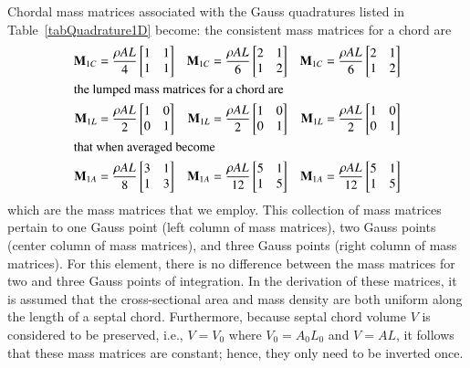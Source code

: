 Chordal mass matrices associated with the Gauss quadratures listed in Table~\ref{tabQuadrature1D} become: the consistent mass matrices for a chord are
\begin{subequations}
	\label{massMatrices1D}
	\begin{align}
	\mathbf{M}_{1C} & = \frac{\rho A L}{4} 
	\begin{bmatrix} 1 & 1 \\ 1 & 1 \end{bmatrix} & 
	\mathbf{M}_{1C} & = \frac{\rho A L}{6} 
	\begin{bmatrix} 2 & 1 \\ 1 & 2 \end{bmatrix} & 
	\mathbf{M}_{1C} & = \frac{\rho A L}{6} 
	\begin{bmatrix} 2 & 1 \\ 1 & 2 \end{bmatrix} 
	\label{ConsMassMatrix1D} \\
	\intertext{the lumped mass matrices for a chord are}
	\mathbf{M}_{1L} & = \frac{\rho A L}{2} 
	\begin{bmatrix} 1 & 0 \\ 0 & 1 \end{bmatrix} & 
	\mathbf{M}_{1L} & = \frac{\rho A L}{2} 
	\begin{bmatrix} 1 & 0 \\ 0 & 1 \end{bmatrix} & 
	\mathbf{M}_{1L} & = \frac{\rho A L}{2} 
	\begin{bmatrix} 1 & 0 \\ 0 & 1 \end{bmatrix} 
	\label{LumMassMatrix1D} \\
	\intertext{that when averaged become}
	\mathbf{M}_{1A} & = \frac{\rho A L}{8} 
	\begin{bmatrix} 3 & 1 \\ 1 & 3 \end{bmatrix} & 
	\mathbf{M}_{1A} & = \frac{\rho A L}{12} 
	\begin{bmatrix} 5 & 1 \\ 1 & 5 \end{bmatrix} & 
	\mathbf{M}_{1A} & = \frac{\rho A L}{12} 
	\begin{bmatrix} 5 & 1 \\ 1 & 5 \end{bmatrix}
	\label{avgMassMatrix1D}
	\end{align}
\end{subequations}
which are the mass matrices that we employ.  This collection of mass matrices pertain to one Gauss point (left column of mass matrices), two Gauss points (center column of mass matrices), and three Gauss points (right column of mass matrices).  For this element, there is no difference between the mass matrices for two and three Gauss points of integration.  In the derivation of these matrices, it is assumed that the cross-sectional area and mass density  are both uniform along the length of a septal chord.  Furthermore, because septal chord volume $V$ is considered to be preserved, i.e., $V = V_0$ where $V_0 = A_0 L_0$ and $V = A L$, it follows that these mass matrices are constant; hence, they only need to be inverted once.

